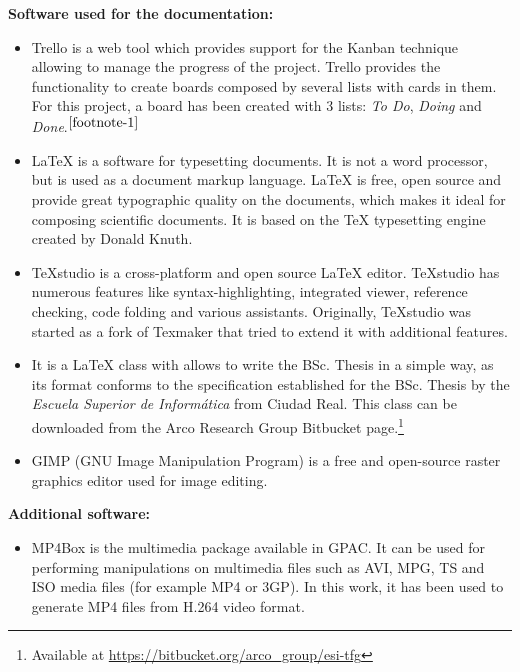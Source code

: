 \textbf{Software used for the documentation:}
\begin{itemize}
	\item {} Trello is a web tool which provides support for the Kanban technique allowing to manage the progress of the project. Trello provides the functionality to create boards composed by several lists with cards in them. For this project, a board has been created with 3 lists: \emph{To Do}, \emph{Doing} and \emph{Done}.$^{\ref{footnote-1}}$
	
	
	\item {} \LaTeX{} is a software for typesetting documents. It is not a word processor, but is used as a document markup language. \LaTeX{} is free, open source and provide great typographic quality on the documents, which makes it ideal for composing scientific documents. It is based on the \TeX{} typesetting engine created by Donald Knuth.
	
	\item {} TeXstudio is a cross-platform and open source \LaTeX{} editor. TeXstudio has numerous features like syntax-highlighting, integrated viewer, reference checking, code folding and various assistants. Originally, TeXstudio was started as a fork of Texmaker that tried to extend it with additional features. 
	
	\item {} It is a \LaTeX{} class with allows to write the \ac{BSc.} Thesis in a simple way, as its format conforms to the specification established for the \ac{BSc.} Thesis by the \emph{Escuela Superior de Informática} from Ciudad Real. This class can be downloaded from the Arco Research Group Bitbucket page.\footnote{Available at \url{https://bitbucket.org/arco_group/esi-tfg}}
	
	\item {} GIMP (\ac{GNU} Image Manipulation Program) is a free and open-source raster graphics editor used for image editing.
	
	
\end{itemize}

\textbf{Additional software:}
\begin{itemize}
	\item {} MP4Box is the multimedia package available in GPAC. It can be used for performing manipulations on multimedia files such as AVI, MPG, TS and ISO media files (for example MP4 or 3GP). In this work, it has been used to generate MP4 files from H.264 video format.
	
	
\end{itemize}
